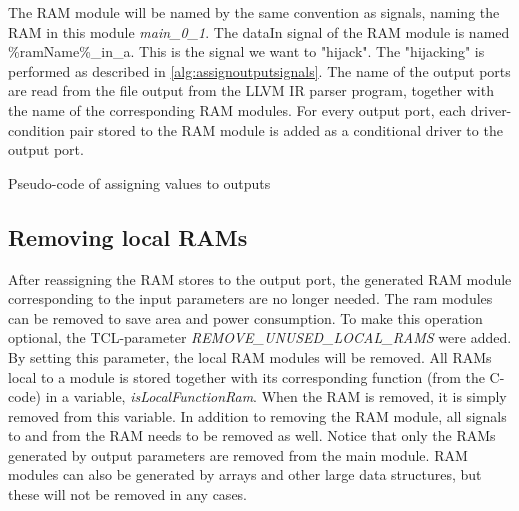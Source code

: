 The RAM module will be named by the same convention as signals, naming the RAM in this module \textit{main\_0\_1}. The dataIn signal of the RAM module is named \%ramName\%\_in\_a. This is the signal we want to "hijack". The "hijacking" is performed as described in \cref{alg:assignoutputsignals}. The name of the output ports are read from the file output from the LLVM IR parser program, together with the name of the corresponding RAM modules. For every output port, each driver-condition pair stored to the RAM module is added as a conditional driver to the output port.
\makeatletter
\let\OldStatex\Statex
\renewcommand{\Statex}[1][3]{%
  \setlength\@tempdima{\algorithmicindent}%
  \OldStatex\hskip\dimexpr#1\@tempdima\relax}
\makeatother
\begin{algorithm}
  \caption{Pseudo-code of assigning values to outputs
  \label{alg:assignoutputsignals}}
\end{algorithm}

\subsection{Removing local RAMs}
After reassigning the RAM stores to the output port, the generated RAM module corresponding to the input parameters are no longer needed. The ram modules can be removed to save area and power consumption. To make this operation optional, the TCL-parameter \textit{REMOVE\_UNUSED\_LOCAL\_RAMS} were added. By setting this parameter, the local RAM modules will be removed. All RAMs local to a module is stored together with its corresponding function (from the C-code) in a variable, \textit{	isLocalFunctionRam}. When the RAM is removed, it is simply removed from this variable. In addition to removing the RAM module, all signals to and from the RAM needs to be removed as well. Notice that only the RAMs generated by output parameters are removed from the main module. RAM modules can also be generated by arrays and other large data structures, but these will not be removed in any cases.

